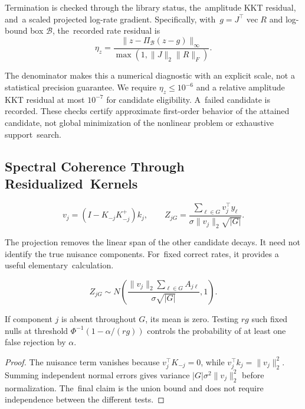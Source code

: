 \documentclass[mathematics,article,accept,moreauthors]{Definitions/mdpi}
\begin{document}
Termination is checked through the library status, the~amplitude KKT residual, and~a scaled projected log-rate gradient. Specifically, with~$g=J^\top\operatorname{vec}R$ and log-bound box $\mathcal B$, the~recorded rate residual is
\begin{equation}\label{eq:stationarity}
 \eta_z=\frac{\|z-\Pi_{\mathcal B}(z-g)\|_\infty}
 {\max(1,\|J\|_2\|R\|_F)}.
\end{equation}

The denominator makes this a numerical diagnostic with an explicit scale, not a statistical precision guarantee. We require $\eta_z\leq10^{-6}$ and a relative amplitude KKT residual at most $10^{-7}$ for candidate eligibility. A~failed candidate is recorded. These checks certify approximate first-order behavior of the attained candidate, not global minimization of the nonlinear problem or exhaustive support~search.

\subsection{Spectral Coherence Through Residualized~Kernels}\label{sec:screen}
\begin{equation}\label{eq:score}
 v_j=(I-K_{-j}K_{-j}^+)k_j,\qquad
 Z_{jG}=\frac{\sum_{\ell\in G}v_j^\top y_\ell}
 {\sigma\|v_j\|_2\sqrt{|G|}}.
\end{equation}

The projection removes the linear span of the other candidate decays. It need not identify the true nuisance components. For~fixed correct rates, it provides a useful elementary~calculation.

\begin{Proposition}\label{prop:screen}
\begin{equation}\label{eq:scoremean}
 Z_{jG}\sim N\left(
 \frac{\|v_j\|_2\sum_{\ell\in G}A_{j\ell}}{\sigma\sqrt{|G|}},1\right).
\end{equation}

If component $j$ is absent throughout $G$, its mean is zero. Testing $rg$ such fixed nulls at threshold $\Phi^{-1}(1-\alpha/(rg))$ controls the probability of at least one false rejection by $\alpha$.
\end{Proposition}
\begin{proof}

The nuisance term vanishes because $v_j^\top K_{-j}=0$, while $v_j^\top k_j=\|v_j\|_2^2$. Summing independent normal errors gives variance $|G|\sigma^2\|v_j\|_2^2$ before normalization. The~final claim is the union bound and does not require independence between the different tests.
\end{proof}
\end{document}

